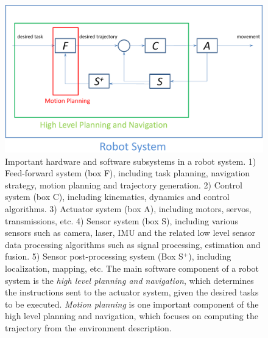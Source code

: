 \begin{figure}[htb]
  \centering
  \includegraphics[width=\linewidth]{figs/1/pipeline-crop.pdf}
  \caption[Important hardware and software subsystems in a robot system]{Important hardware and software subsystems in a robot system. 1) Feed-forward system (box F), including task planning, navigation strategy, motion planning and trajectory generation. 2) Control system (box C), including kinematics, dynamics and control algorithms. 3) Actuator system (box A), including motors, servos, transmissions, etc. 4) Sensor system (box S), including various sensors such as camera, laser, IMU and the related low level sensor data processing algorithms such as signal processing, estimation and fusion. 5) Sensor post-processing system (Box S$^+$), including localization, mapping, etc. The main software component of a robot system is the \emph{high level planning and navigation}, which determines the instructions sent to the actuator system, given the desired tasks to be executed. \emph{Motion planning} is one important component of the high level planning and navigation, which focuses on computing the trajectory from the environment description.}
  \label{fig:1:pipeline}
\end{figure}

